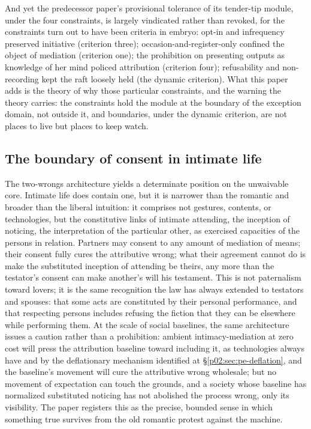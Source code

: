 \documentclass[11pt,a4paper]{article}
\begin{document}
And yet the predecessor paper's provisional tolerance of its tender-tip module, under the four constraints, is largely vindicated rather than revoked, for the constraints turn out to have been criteria in embryo: opt-in and infrequency preserved initiative (criterion three); occasion-and-register-only confined the object of mediation (criterion one); the prohibition on presenting outputs as knowledge of her mind policed attribution (criterion four); refusability and non-recording kept the raft loosely held (the dynamic criterion). What this paper adds is the theory of why those particular constraints, and the warning the theory carries: the constraints hold the module at the boundary of the exception domain, not outside it, and boundaries, under the dynamic criterion, are not places to live but places to keep watch.

\subsection{The boundary of consent in intimate life}
\label{p02:sec:implications-consent}

The two-wrongs architecture yields a determinate position on the unwaivable core. Intimate life does contain one, but it is narrower than the romantic and broader than the liberal intuition: it comprises not gestures, contents, or technologies, but the constitutive links of intimate attending, the inception of noticing, the interpretation of the particular other, as exercised capacities of the persons in relation. Partners may consent to any amount of mediation of means; their consent fully cures the attributive wrong; what their agreement cannot do is make the substituted inception of attending be theirs, any more than the testator's consent can make another's will his testament. This is not paternalism toward lovers; it is the same recognition the law has always extended to testators and spouses: that some acts are constituted by their personal performance, and that respecting persons includes refusing the fiction that they can be elsewhere while performing them. At the scale of social baselines, the same architecture issues a caution rather than a prohibition: ambient intimacy-mediation at zero cost will press the attribution baseline toward including it, as technologies always have and by the deflationary mechanism identified at \S\ref{p02:sec:pe-deflation}, and the baseline's movement will cure the attributive wrong wholesale; but no movement of expectation can touch the grounds, and a society whose baseline has normalized substituted noticing has not abolished the process wrong, only its visibility. The paper registers this as the precise, bounded sense in which something true survives from the old romantic protest against the machine.
\end{document}
